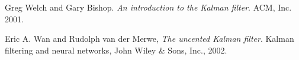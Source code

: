 \documentclass[12pt]{article}
\begin{document}

\begin{thebibliography}{9}

Greg Welch and Gary Bishop.
\textit{An introduction to the Kalman filter}. 
ACM, Inc. 2001.

Eric A. Wan and Rudolph van der Merwe, 
\textit{The uncented Kalman filter}. 
Kalman filtering and neural networks, John Wiley \& Sons, Inc., 2002.

\end{thebibliography}
\end{document}
